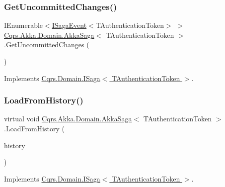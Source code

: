 \subsubsection{\texorpdfstring{Get\+Uncommitted\+Changes()}{GetUncommittedChanges()}}
{\footnotesize\ttfamily I\+Enumerable$<$\hyperlink{interfaceCqrs_1_1Events_1_1ISagaEvent}{I\+Saga\+Event}$<$T\+Authentication\+Token$>$ $>$ \hyperlink{classCqrs_1_1Akka_1_1Domain_1_1AkkaSaga}{Cqrs.\+Akka.\+Domain.\+Akka\+Saga}$<$ T\+Authentication\+Token $>$.Get\+Uncommitted\+Changes (\begin{DoxyParamCaption}{ }\end{DoxyParamCaption})}



Implements \hyperlink{interfaceCqrs_1_1Domain_1_1ISaga_abb77811b4f7d19adb61f9d33da18e7e0_abb77811b4f7d19adb61f9d33da18e7e0}{Cqrs.\+Domain.\+I\+Saga$<$ T\+Authentication\+Token $>$}.

\mbox{\label{classCqrs_1_1Akka_1_1Domain_1_1AkkaSaga_a40b859bc15c2f7c87a21b07f9bc9548c_a40b859bc15c2f7c87a21b07f9bc9548c}} 
\subsubsection{\texorpdfstring{Load\+From\+History()}{LoadFromHistory()}}
{\footnotesize\ttfamily virtual void \hyperlink{classCqrs_1_1Akka_1_1Domain_1_1AkkaSaga}{Cqrs.\+Akka.\+Domain.\+Akka\+Saga}$<$ T\+Authentication\+Token $>$.Load\+From\+History (\begin{DoxyParamCaption}\item[{I\+Enumerable$<$ \hyperlink{interfaceCqrs_1_1Events_1_1ISagaEvent}{I\+Saga\+Event}$<$ T\+Authentication\+Token $>$$>$}]{history }\end{DoxyParamCaption})\hspace{0.3cm}{\ttfamily [virtual]}}



Implements \hyperlink{interfaceCqrs_1_1Domain_1_1ISaga_a2714804684bc65cf4dec79b4697b9b21_a2714804684bc65cf4dec79b4697b9b21}{Cqrs.\+Domain.\+I\+Saga$<$ T\+Authentication\+Token $>$}.

\mbox{\label{classCqrs_1_1Akka_1_1Domain_1_1AkkaSaga_a83269fac4653cca097461e924feaea7f_a83269fac4653cca097461e924feaea7f}} 
